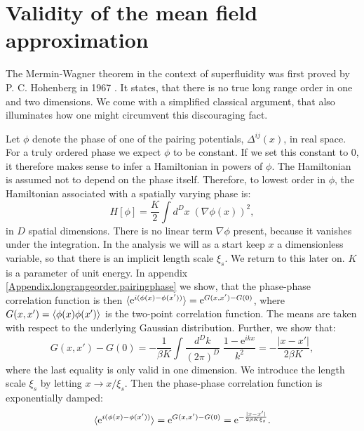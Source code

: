\section{Validity of the mean field approximation} \label{sec.meanfieldvalidity}
The Mermin-Wagner theorem in the context of superfluidity was first proved by P. C. Hohenberg in 1967 \cite{Hohenberg.MerminWagnertheorem}. It states, that there is no true long range order in one and two dimensions. We come with a simplified classical argument, that also illuminates how one might circumvent this discouraging fact. 

Let $\phi$ denote the phase of one of the pairing potentials, $\Delta^{ij}(x)$, in real space. For a truly ordered phase we expect $\phi$ to be constant. If we set this constant to 0, it therefore makes sense to infer a Hamiltonian in powers of $\phi$. The Hamiltonian is assumed not to depend on the phase itself. Therefore, to lowest order in $\phi$, the Hamiltonian associated with a spatially varying phase is: 
\begin{equation}
H[\phi] = \frac{K}{2}\int d^{D}x \; \left(\nabla \phi(x)\right)^2, 
\label{eq.Hphi.maintext}
\end{equation}
in $D$ spatial dimensions. There is no linear term $\nabla \phi$ present, because it vanishes under the integration. In the analysis we will as a start keep $x$ a dimensionless variable, so that there is an implicit length scale $\xi_s$. We return to this later on. $K$ is a parameter of unit energy. In appendix \ref{Appendix.longrangeorder.pairingphase} we show, that the phase-phase correlation function is then $\braket{ \text{e}^{i(\phi(x)- \phi(x'))} } = \text{e}^{G(x,x') - G(0)}$, where $G(x,x') = \braket{\phi(x)\phi(x')}$ is the two-point correlation function. The means are taken with respect to the underlying Gaussian distribution. Further, we show that:
\begin{equation}
G(x,x') - G(0) = -\frac{1}{\beta K}\int \frac{d^{D}k}{(2\pi)^D}\; \frac{1 - \text{e}^{ikx}}{k^2} = -\frac{|x - x'|}{2\beta K}, \nonumber 
\end{equation}
where the last equality is only valid in one dimension. We introduce the length scale $\xi_s$ by letting $x \to x / \xi_s$. Then the phase-phase correlation function is exponentially damped: 
\begin{equation}
\braket{ \text{e}^{i(\phi(x)- \phi(x'))} } = \text{e}^{G(x,x') - G(0)} = \text{e}^{-\frac{|x - x'|}{2\beta K \xi_s}}. 
\label{eq.phasecorrelationfunction.onedimension.maintext} 
\end{equation}
